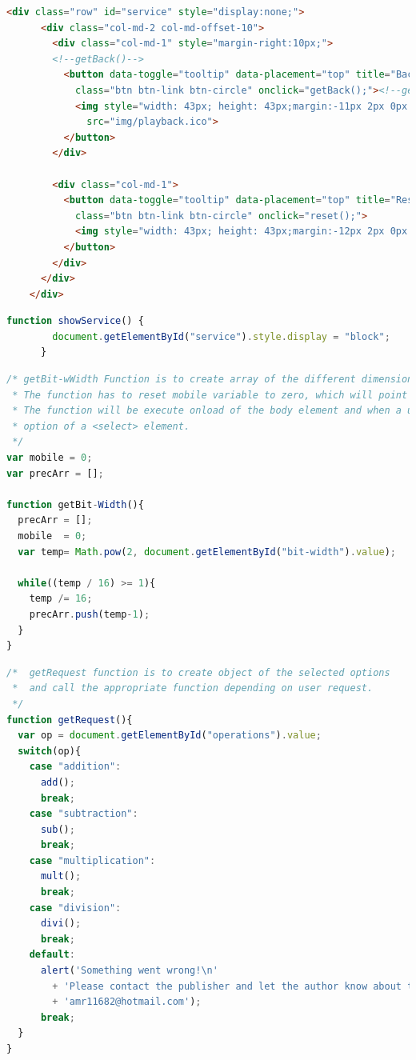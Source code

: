 \documentclass[11pt]{article}
\begin{document}
\begin{lstlisting}[label={lst:select option button}, language=html, caption={Back and Reset buttons},]
    <div class="row" id="service" style="display:none;">
      <div class="col-md-2 col-md-offset-10">
        <div class="col-md-1" style="margin-right:10px;">
        <!--getBack()-->
          <button data-toggle="tooltip" data-placement="top" title="Back" type="button" 
            class="btn btn-link btn-circle" onclick="getBack();"><!--getBack-->
            <img style="width: 43px; height: 43px;margin:-11px 2px 0px -6px;" 
              src="img/playback.ico">
          </button>
        </div>

        <div class="col-md-1">
          <button data-toggle="tooltip" data-placement="top" title="Reset" type="button" 
            class="btn btn-link btn-circle" onclick="reset();">
            <img style="width: 43px; height: 43px;margin:-12px 2px 0px -7px;" src="img/reset.ico">
          </button>
        </div>
      </div>
    </div>
\end{lstlisting}

\begin{lstlisting}[label={lst:showService}, language=Javascript, caption={showService function will change style of buttons to block},]
      function showService() {
        document.getElementById("service").style.display = "block";
      }
\end{lstlisting}

\begin{lstlisting}[label={lst:getBit-Width}, language=Javascript, caption={getBit-Width function},]
/* getBit-wWidth Function is to create array of the different dimensional to chart.
 * The function has to reset mobile variable to zero, which will point to the start of precArr.
 * The function will be execute onload of the body element and when a user changes the selected 
 * option of a <select> element.
 */
var mobile = 0;
var precArr = [];

function getBit-Width(){
  precArr = [];
  mobile  = 0;
  var temp= Math.pow(2, document.getElementById("bit-width").value);

  while((temp / 16) >= 1){
    temp /= 16;
    precArr.push(temp-1); 
  }
}
\end{lstlisting}

\begin{lstlisting}[label={lst:getRequest}, language=Javascript, caption={getRequest function},]
/*  getRequest function is to create object of the selected options
 *  and call the appropriate function depending on user request.
 */
function getRequest(){
  var op = document.getElementById("operations").value;
  switch(op){
    case "addition":
      add();
      break;
    case "subtraction":
      sub();
      break;
    case "multiplication":
      mult();
      break;
    case "division":
      divi();
      break;
    default:
      alert('Something went wrong!\n'
        + 'Please contact the publisher and let the author know about the bug.\n'
        + 'amr11682@hotmail.com');
      break;
  }
}
\end{lstlisting}
\end{document}
